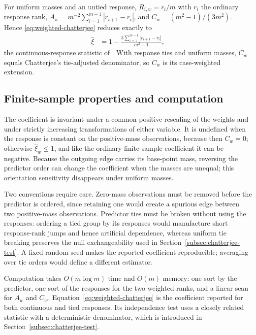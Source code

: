 For uniform masses and an untied response, $R_{i,w}=r_i/m$ with $r_i$ the
ordinary response rank, $A_w = m^{-2}\sum_{i=1}^{m-1}|r_{i+1}-r_i|$, and
$C_w=(m^2-1)/(3m^2)$. Hence \eqref{eq:weighted-chatterjee} reduces exactly to
\begin{align*}
    \widehat\xi
    &= 1-\frac{3\sum_{i=1}^{m-1}|r_{i+1}-r_i|}{m^2-1},
\end{align*}
the continuous-response statistic of \citet{chatterjee2021}. With response
ties and uniform masses, $C_w$ equals Chatterjee's tie-adjusted denominator,
so $C_w$ is its case-weighted extension.

\subsection{Finite-sample properties and computation}

The coefficient is invariant under a common positive rescaling of the weights
and under strictly increasing transformations of either variable. It is
undefined when the response is constant on the positive-mass observations,
because then $C_w=0$; otherwise $\widehat\xi_w\leq1$, and like the ordinary
finite-sample coefficient it can be negative. Because the outgoing edge
carries its base-point mass, reversing the predictor order can change the
coefficient when the masses are unequal; this orientation sensitivity
disappears under uniform masses.

Two conventions require care. Zero-mass observations must be removed before
the predictor is ordered, since retaining one would create a spurious edge
between two positive-mass observations. Predictor ties must be broken without
using the responses: ordering a tied group by its responses would manufacture
short response-rank jumps and hence artificial dependence, whereas uniform tie
breaking preserves the null exchangeability used in
Section~\ref{subsec:chatterjee-test}. A fixed random seed makes the reported
coefficient reproducible; averaging over tie orders would define a different
estimator.

Computation takes $O(m\log m)$ time and $O(m)$ memory: one sort by the
predictor, one sort of the responses for the two weighted ranks, and a linear
scan for $A_w$ and $C_w$. Equation~\eqref{eq:weighted-chatterjee} is the
coefficient reported for both continuous and tied responses. Its independence
test uses a closely related statistic with a deterministic denominator, which
is introduced in Section~\ref{subsec:chatterjee-test}.
